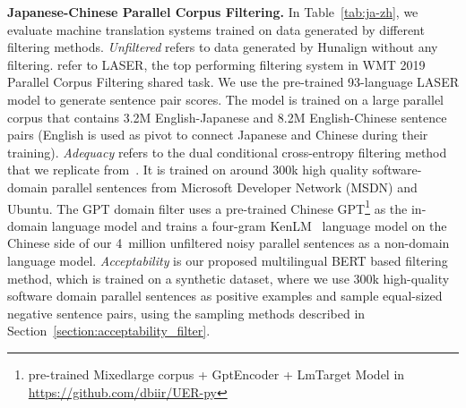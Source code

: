 \documentclass[11pt,a4paper]{article}
\begin{document}
\textbf{Japanese-Chinese Parallel Corpus Filtering.} In Table~\ref{tab:ja-zh}, we evaluate machine translation systems trained on data generated by different filtering methods.  {\em Unfiltered} refers to data generated by Hunalign without any filtering. \citet{chaudhary2019low} refer to LASER, the top performing filtering system in WMT 2019 Parallel Corpus Filtering shared task. We use the pre-trained 93-language LASER model to generate sentence pair scores. The model is trained on a large parallel corpus that contains 3.2M English-Japanese and 8.2M English-Chinese sentence pairs (English is used as pivot to connect Japanese and Chinese during their training). {\em Adequacy} refers to the dual conditional cross-entropy filtering method that we replicate from~\citet{junczys2018dual}. It is trained on around 300k high quality software-domain parallel sentences from Microsoft Developer Network (MSDN) and Ubuntu. The GPT domain filter uses a pre-trained Chinese GPT\footnote{pre-trained Mixedlarge corpus + GptEncoder + LmTarget Model in \url{https://github.com/dbiir/UER-py}} as the in-domain language model and trains a four-gram KenLM~\cite{heafield2011kenlm} language model on the Chinese side of our 4~million unfiltered noisy parallel sentences as a non-domain language model. {\em Acceptability} is our proposed multilingual BERT based filtering method, which is trained on a synthetic dataset, where we use 300k high-quality software domain parallel sentences as positive examples and sample equal-sized negative sentence pairs, using the sampling methods described in Section~\ref{section:acceptability_filter}. 
\end{document}

